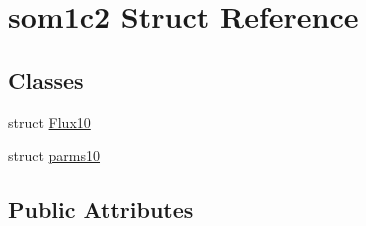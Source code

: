 \hypertarget{structsom1c2}{\section{som1c2 Struct Reference}
\label{structsom1c2}
}
\subsection*{Classes}
\begin{DoxyCompactItemize}
\item 
struct \hyperlink{structsom1c2_1_1_flux10}{Flux10}
\item 
struct \hyperlink{structsom1c2_1_1parms10}{parms10}
\end{DoxyCompactItemize}
\subsection*{Public Attributes}
